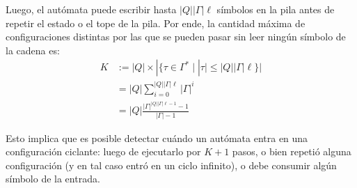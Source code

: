 Luego, el autómata puede escribir hasta $|Q| |\Gamma| \ell$ símbolos en la pila antes de repetir el estado o el tope de la pila. Por ende, la cantidad máxima de configuraciones distintas por las que se pueden pasar sin leer ningún símbolo de la cadena es:
$$
\begin{aligned}
    K & := |Q| \times |\{\tau \in \Gamma^* \mid |\tau| \leq |Q| |\Gamma| \ell\}| \\
    & = |Q| \sum_{i=0}^{|Q| |\Gamma| \ell} |\Gamma|^i \\
    & = |Q| \frac{|\Gamma|^{|Q| |\Gamma| \ell - 1} - 1}{|\Gamma| - 1}
\end{aligned}
$$

Esto implica que es posible detectar cuándo un autómata entra en una configuración ciclante: luego de ejecutarlo por $K + 1$ pasos, o bien repetió alguna configuración (y en tal caso entró en un ciclo infinito), o debe consumir algún símbolo de la entrada.
